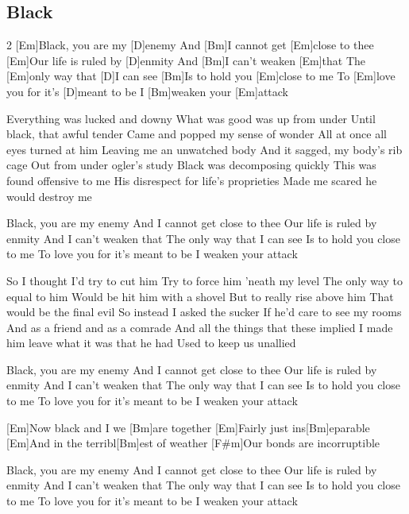 \subsection*{Black   }
\begin{guitar}
\begin{multicols}{2}
[Em]Black, you are my [D]enemy
And [Bm]I cannot get [Em]close to thee
[Em]Our life is ruled by [D]enmity
And [Bm]I can't weaken [Em]that
The [Em]only way that [D]I can see
[Bm]Is to hold you [Em]close to me
To [Em]love you for it's [D]meant to be
I [Bm]weaken your [Em]attack

Everything was lucked and downy
What was good was up from under
Until black, that awful tender
Came and popped my sense of wonder
All at once all eyes turned at him
Leaving me an unwatched body
And it sagged, my body's rib cage
Out from under ogler's study
Black was decomposing quickly
This was found offensive to me
His disrespect for life's proprieties
Made me scared he would destroy me

Black, you are my enemy
And I cannot get close to thee
Our life is ruled by enmity
And I can't weaken that
The only way that I can see
Is to hold you close to me
To love you for it's meant to be
I weaken your attack

So I thought I'd try to cut him
Try to force him 'neath my level
The only way to equal to him
Would be hit him with a shovel
But to really rise above him
That would be the final evil
So instead I asked the sucker
If he'd care to see my rooms
And as a friend and as a comrade
And all the things that these implied
I made him leave what it was that he had
Used to keep us unallied

Black, you are my enemy
And I cannot get close to thee
Our life is ruled by enmity
And I can't weaken that
The only way that I can see
Is to hold you close to me
To love you for it's meant to be
I weaken your attack

[Em]Now black and I we [Bm]are together
[Em]Fairly just ins[Bm]eparable
[Em]And in the terribl[Bm]est of weather
[F#m]Our bonds are incorruptible

Black, you are my enemy
And I cannot get close to thee
Our life is ruled by enmity
And I can't weaken that
The only way that I can see
Is to hold you close to me
To love you for it's meant to be
I weaken your attack

\end{multicols}


\end{guitar}
